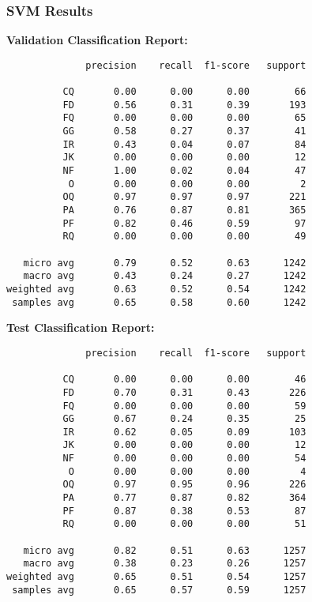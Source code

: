 \documentclass{article}
\begin{document}
\subsubsection{SVM Results}
\textbf{Validation Classification Report:}
\begin{verbatim}
              precision    recall  f1-score   support

          CQ       0.00      0.00      0.00        66
          FD       0.56      0.31      0.39       193
          FQ       0.00      0.00      0.00        65
          GG       0.58      0.27      0.37        41
          IR       0.43      0.04      0.07        84
          JK       0.00      0.00      0.00        12
          NF       1.00      0.02      0.04        47
           O       0.00      0.00      0.00         2
          OQ       0.97      0.97      0.97       221
          PA       0.76      0.87      0.81       365
          PF       0.82      0.46      0.59        97
          RQ       0.00      0.00      0.00        49

   micro avg       0.79      0.52      0.63      1242
   macro avg       0.43      0.24      0.27      1242
weighted avg       0.63      0.52      0.54      1242
 samples avg       0.65      0.58      0.60      1242
\end{verbatim}
\textbf{Test Classification Report:}
\begin{verbatim}
              precision    recall  f1-score   support

          CQ       0.00      0.00      0.00        46
          FD       0.70      0.31      0.43       226
          FQ       0.00      0.00      0.00        59
          GG       0.67      0.24      0.35        25
          IR       0.62      0.05      0.09       103
          JK       0.00      0.00      0.00        12
          NF       0.00      0.00      0.00        54
           O       0.00      0.00      0.00         4
          OQ       0.97      0.95      0.96       226
          PA       0.77      0.87      0.82       364
          PF       0.87      0.38      0.53        87
          RQ       0.00      0.00      0.00        51

   micro avg       0.82      0.51      0.63      1257
   macro avg       0.38      0.23      0.26      1257
weighted avg       0.65      0.51      0.54      1257
 samples avg       0.65      0.57      0.59      1257
\end{verbatim}
\end{document}
